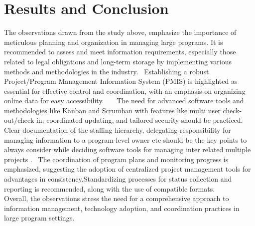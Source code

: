 \documentclass{llncs}
\begin{document}
\section{Results and Conclusion}
The observations drawn from the study above, emphasize the importance of meticulous planning and organization in managing large programs. It is recommended to assess and meet information requirements, especially those related to legal obligations and long-term storage by implementing various methods and methodologies in the industry.~\cite{refpaper8} Establishing a robust Project/Program Management Information System (PMIS) is highlighted as essential for effective control and coordination, with an emphasis on organizing online data for easy accessibility. ~\cite{refpaper8}~\cite{refpaper1}~\cite{refpaper2}The need for advanced software tools and methodologies like Kanban and Scrumban with features like multi user check-out/check-in, coordinated updating, and tailored security should be practiced. Clear documentation of the staffing hierarchy, delegating responsibility for managing information to a program-level owner etc should be the key points to always consider while deciding software tools for managing inter related multiple projects .~\cite{refpaper8} The coordination of program plans and monitoring progress is emphasized, suggesting the adoption of centralized project management tools for advantages in consistency.Standardizing processes for status collection and reporting is recommended, along with the use of compatible formats. \\
Overall, the observations stress the need for a comprehensive approach to information management, technology adoption, and coordination practices in large program settings.~\cite{refpaper8}~\cite{refpaper2}~\cite{refpaper10}
\end{document}
